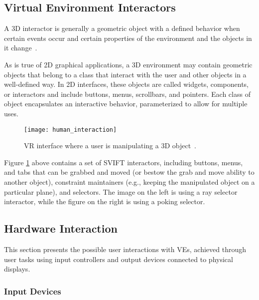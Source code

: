 \subsection{Virtual Environment Interactors}
\label{sec:interactors}


A \gls{3D} interactor is generally a geometric object with a defined behavior when certain events 
occur and certain properties of the environment and the objects in it change~\cite{hale2014handbook}.

As is true of \gls{2D} graphical applications, a \gls{3D} environment may contain geometric objects that 
belong to a class that interact with the user and other objects in a well-defined way. In \gls{2D} interfaces, 
these objects are called widgets, components, or interactors and include buttons, menus, scrollbars, 
and pointers. Each class of object encapsulates an interactive behavior, parameterized to allow for 
multiple uses. 



\begin{figure}[h!]
    \centering
    \texttt{[image: human\_interaction]}
    \caption{\gls{VR} interface where a user is manipulating a \gls{3D} object~\cite{hale2014handbook}.} %
    \label{fig:human_interaction}
\end{figure}
\FloatBarrier


Figure \ref{fig:human_interaction} above contains a set of \gls{SVIFT} interactors, including buttons, menus, and tabs
that can be grabbed and moved (or bestow the grab and move ability to another object), constraint maintainers 
(e.g., keeping the manipulated object on a particular plane), and selectors. The image on the left is using a 
ray selector interactor, while the figure on the right is using a poking selector.


\subsection{Hardware Interaction}
\label{sec:hardware_interaction}

This section presents the possible user interactions with \glspl{VE}, achieved through user tasks using input controllers and output devices connected to physical displays.

\subsubsection{Input Devices}
\label{sec:input_devices}

